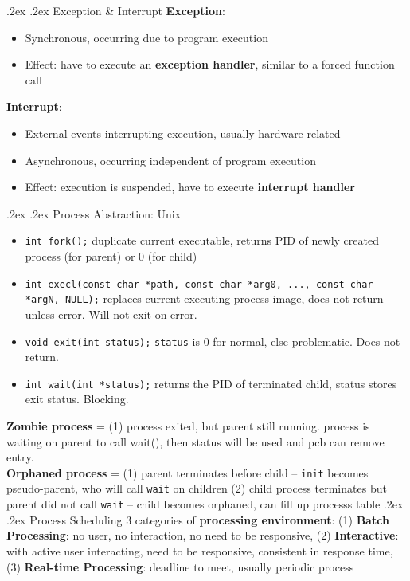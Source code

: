 \documentclass[10pt,landscape,a4paper]{article}
\makeatletter
\renewcommand{\section}{\@startsection{section}{1}{0mm}%
  {.2ex}%
  {.2ex}%
{\color{myblue}\sffamily\small\bfseries}}
\renewcommand{\subsection}{\@startsection{subsection}{1}{0mm}%
  {.2ex}%
  {.2ex}%
{\sffamily\bfseries}}
\makeatother
\begin{document}
\begin{multicols*}{4}
  \subsection{Exception \& Interrupt}
  \textbf{Exception}:
  \begin{itemize}
    \item Synchronous, occurring due to program execution
    \item Effect: have to execute an \textbf{exception handler}, similar to a forced function call
  \end{itemize}
  \textbf{Interrupt}:
  \begin{itemize}
    \item External events interrupting execution, usually hardware-related
    \item Asynchronous, occurring independent of program execution
    \item Effect: execution is suspended, have to execute \textbf{interrupt handler}
  \end{itemize}
  \subsection{Process Abstraction: Unix}
  \begin{itemize}
    \item \texttt{int fork();} duplicate current executable, returns PID of newly created process (for parent) or 0 (for child)
    \item \texttt{int execl(const char *path, const char *arg0, ..., const char *argN, NULL);} replaces current executing process image, does not return unless error. Will not exit on error.
    \item \texttt{void exit(int status);} \texttt{status} is 0 for normal, else problematic. Does not return.
    \item \texttt{int wait(int *status);} returns the PID of terminated child, status stores exit status. Blocking.
  \end{itemize}
  \textbf{Zombie process} = (1) process exited, but parent still running. process is waiting on parent to call wait(), then status will be used and pcb can remove entry.\\
  \textbf{Orphaned process} = (1) parent terminates before child -- \texttt{init} becomes pseudo-parent, who will call \texttt{wait} on children (2) child process terminates but parent did not call \texttt{wait} -- child becomes orphaned, can fill up processs table
  \section{Process Scheduling}
  3 categories of \textbf{processing environment}: (1) \textbf{Batch Processing}: no user, no interaction, no need to be responsive, (2) \textbf{Interactive}: with active user interacting, need to be responsive, consistent in response time, (3) \textbf{Real-time Processing}: deadline to meet, usually periodic process

\end{multicols*}
\end{document}
